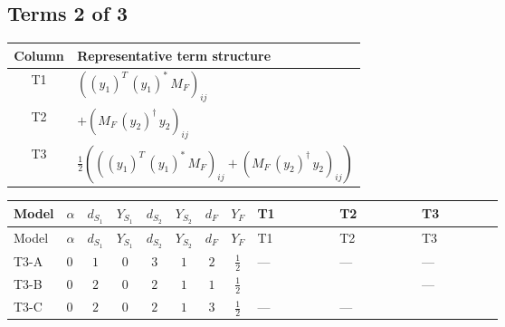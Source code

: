 \documentclass[8pt]{article}
\begin{document}
\begin{landscape}
\subsection*{Terms 2 of 3}
\begin{center}
\begin{tabular}{@{}c >{\raggedright\arraybackslash}p{0.82\linewidth}@{}}
\toprule
Column & Representative term structure \\
\midrule
T1 & \(\displaystyle \left(\left({y_1}\right)^{T}\,\left({y_1}\right)^{*}\,{M_F}\right)_{ij}\) \\
\midrule
T2 & \(\displaystyle +\left({M_F}\,\left({y_2}\right)^{\dagger}\,{y_2}\right)_{ij}\) \\
\midrule
T3 & \(\displaystyle \frac{1}{2} (\left(\left({y_1}\right)^{T}\,\left({y_1}\right)^{*}\,{M_F}\right)_{ij}+\left({M_F}\,\left({y_2}\right)^{\dagger}\,{y_2}\right)_{ij})\) \\
\midrule
\bottomrule
\end{tabular}
\end{center}
\smallskip
\tiny
\begin{longtable}{@{}llcccccc >{\raggedright\arraybackslash}p{0.21\linewidth} >{\raggedright\arraybackslash}p{0.21\linewidth} >{\raggedright\arraybackslash}p{0.21\linewidth}@{}}
\toprule
Model & $\alpha$ & $d_{S_1}$ & $Y_{S_1}$ & $d_{S_2}$ & $Y_{S_2}$ & $d_F$ & $Y_F$ & T1 & T2 & T3 \\
\midrule
\endfirsthead
\toprule
Model & $\alpha$ & $d_{S_1}$ & $Y_{S_1}$ & $d_{S_2}$ & $Y_{S_2}$ & $d_F$ & $Y_F$ & T1 & T2 & T3 \\
\midrule
\endhead
T3-A & $0$ & $1$ & $0$ & $3$ & $1$ & $2$ & $\frac{1}{2}$ & --- & --- & --- \\
\midrule
T3-B & $0$ & $2$ & $0$ & $2$ & $1$ & $1$ & $\frac{1}{2}$ & \scriptsize\adjustbox{max width=\linewidth}{$\begin{gathered} \left(\left({y_1}\right)^{T}\,\left({y_1}\right)^{*}\,{M_F}\right)_{ij}\end{gathered}$} & \scriptsize\adjustbox{max width=\linewidth}{$\begin{gathered} +\left({M_F}\,\left({y_2}\right)^{\dagger}\,{y_2}\right)_{ij}\end{gathered}$} & --- \\
\midrule
T3-C & $0$ & $2$ & $0$ & $2$ & $1$ & $3$ & $\frac{1}{2}$ & --- & --- & \scriptsize\adjustbox{max width=\linewidth}{$\begin{gathered} \frac{1}{2} (\left(\left({y_1}\right)^{T}\,\left({y_1}\right)^{*}\,{M_F}\right)_{ij}+\left({M_F}\,\left({y_2}\right)^{\dagger}\,{y_2}\right)_{ij})\end{gathered}$} \\

\end{longtable}
\end{landscape}
\end{document}
